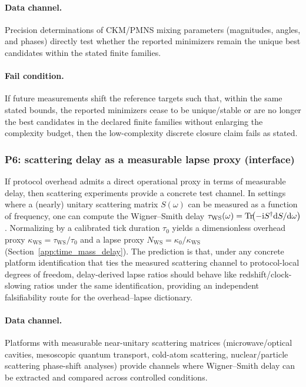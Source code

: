 \paragraph{Data channel.}
Precision determinations of CKM/PMNS mixing parameters (magnitudes, angles, and phases) directly test whether the reported minimizers remain the unique best candidates within the stated finite families.

\paragraph{Fail condition.}
If future measurements shift the reference targets such that, within the same stated bounds, the reported minimizers cease to be unique/stable or are no longer the best candidates in the declared finite families without enlarging the complexity budget, then the low-complexity discrete closure claim fails as stated.

\subsubsection{P6: scattering delay as a measurable lapse proxy (interface)}
\label{subsec:p6_wigner_smith_delay}

If protocol overhead admits a direct operational proxy in terms of measurable delay, then scattering experiments provide a concrete test channel.
In settings where a (nearly) unitary scattering matrix $S(\omega)$ can be measured as a function of frequency, one can compute the Wigner--Smith delay $\tau_{\mathrm{WS}}(\omega)=\mathrm{Tr}\!\bigl(-\mathrm{i} S^\dagger \mathrm{d} S/\mathrm{d}\omega\bigr)$ \cite{Wigner1955,Smith1960}.
Normalizing by a calibrated tick duration $\tau_0$ yields a dimensionless overhead proxy $\kappa_{\mathrm{WS}}=\tau_{\mathrm{WS}}/\tau_0$ and a lapse proxy $N_{\mathrm{WS}}=\kappa_0/\kappa_{\mathrm{WS}}$ (Section~\ref{app:time_mass_delay}).
The prediction is that, under any concrete platform identification that ties the measured scattering channel to protocol-local degrees of freedom, delay-derived lapse ratios should behave like redshift/clock-slowing ratios under the same identification, providing an independent falsifiability route for the overhead--lapse dictionary.

\paragraph{Data channel.}
Platforms with measurable near-unitary scattering matrices (microwave/optical cavities, mesoscopic quantum transport, cold-atom scattering, nuclear/particle scattering phase-shift analyses) provide channels where Wigner--Smith delay can be extracted and compared across controlled conditions.

